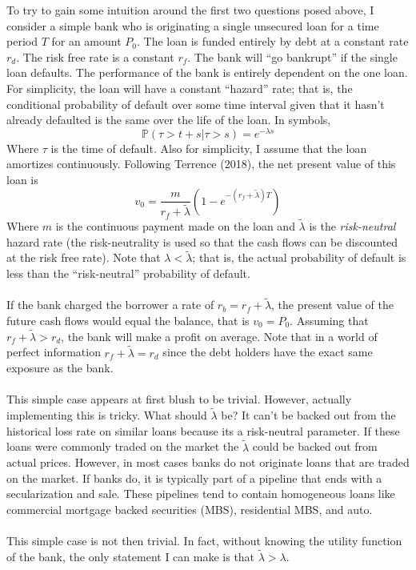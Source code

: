 \documentclass{article}
\begin{document}
To try to gain some intuition around the first two questions posed above, I consider a simple bank who is originating a single unsecured loan for a time period \(T\) for an amount \(P_0\).  The loan is funded entirely by debt at a constant rate \(r_d\).  The risk free rate is a constant \(r_f\).  The bank will ``go bankrupt'' if the single loan defaults.  The performance of the bank is entirely dependent on the one loan.  For simplicity, the loan will have a constant ``hazard'' rate; that is, the conditional probability of default over some time interval given that it hasn't already defaulted is the same over the life of the loan.  In symbols, 
\[\mathbb{P}(\tau>t+s|\tau>s)=e^{-\lambda s}\]
Where \(\tau\) is the time of default.  Also for simplicity, I assume that the loan amortizes continuously.  Following Terrence (2018), the net present value of this loan is 
\[v_0= \frac{m}{r_f+\tilde{\lambda}}\left(1-e^{-(r_f+\tilde{\lambda})T}\right)\]
Where \(m\) is the continuous payment made on the loan and \(\tilde{\lambda}\) is the \emph{risk-neutral} hazard rate (the risk-neutrality is used so that the cash flows can be discounted at the risk free rate).  Note that \(\lambda<\tilde{\lambda}\); that is, the actual probability of default is less than the ``risk-neutral'' probability of default.  
\\
\\
If the bank charged the borrower a rate of \(r_b=r_f+\tilde{\lambda}\), the present value of the future cash flows would equal the balance, that is \(v_0=P_0\).  Assuming that \(r_f+\tilde{\lambda}>r_d\), the bank will make a profit on average.  Note that in a world of perfect information \(r_f+\tilde{\lambda}=r_d\) since the debt holders have the exact same exposure as the bank.  
\\
\\
This simple case appears at first blush to be trivial.  However, actually implementing this is tricky.  What should \(\tilde{\lambda}\) be?  It can't be backed out from the historical loss rate on similar loans because its a risk-neutral parameter.  If these loans were commonly traded on the market the \(\tilde{\lambda}\) could be backed out from actual prices.  However, in most cases banks do not originate loans that are traded on the market.  If banks do, it is typically part of a pipeline that ends with a secularization and sale.  These pipelines tend to contain homogeneous loans like commercial mortgage backed securities (MBS), residential MBS, and auto.  
\\
\\
This simple case is not then trivial.  In fact, without knowing the utility function of the bank, the only statement I can make is that \(\tilde{\lambda}>\lambda\).
\end{document}
